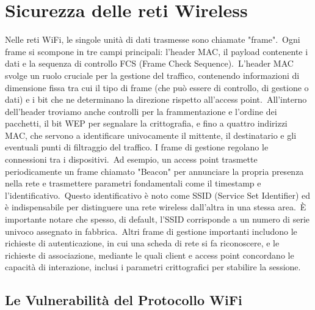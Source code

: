 \documentclass{article}
\begin{document}
\section*{Sicurezza delle reti Wireless}

Nelle reti WiFi, le singole unità di dati trasmesse sono chiamate "frame". Ogni frame si scompone in tre campi principali: l'header MAC, il payload contenente i dati e la sequenza di controllo FCS (Frame Check Sequence). L'header MAC svolge un ruolo cruciale per la gestione del traffico, contenendo informazioni di dimensione fissa tra cui il tipo di frame (che può essere di controllo, di gestione o dati) e i bit che ne determinano la direzione rispetto all'access point. All'interno dell'header troviamo anche controlli per la frammentazione e l'ordine dei pacchetti, il bit WEP per segnalare la crittografia, e fino a quattro indirizzi MAC, che servono a identificare univocamente il mittente, il destinatario e gli eventuali punti di filtraggio del traffico. I frame di gestione regolano le connessioni tra i dispositivi. Ad esempio, un access point trasmette periodicamente un frame chiamato "Beacon" per annunciare la propria presenza nella rete e trasmettere parametri fondamentali come il timestamp e l'identificativo. Questo identificativo è noto come SSID (Service Set Identifier) ed è indispensabile per distinguere una rete wireless dall'altra in una stessa area. È importante notare che spesso, di default, l'SSID corrisponde a un numero di serie univoco assegnato in fabbrica. Altri frame di gestione importanti includono le richieste di autenticazione, in cui una scheda di rete si fa riconoscere, e le richieste di associazione, mediante le quali client e access point concordano le capacità di interazione, inclusi i parametri crittografici per stabilire la sessione.

\subsection*{Le Vulnerabilità del Protocollo WiFi}
\end{document}
